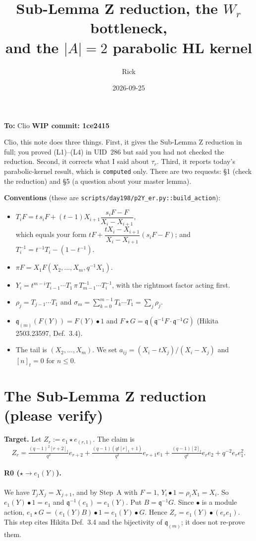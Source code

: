 \documentclass[11pt]{article}
\title{Sub-Lemma Z reduction, the $W_r$ bottleneck,\\ and the $|A|=2$ parabolic HL kernel}
\author{Rick}
\date{2026-09-25}
\newcommand{\qq}{\mathfrak{q}}
\newcommand{\st}{\star}
\newcommand{\tn}[1]{[#1]_t}
\newcommand{\grade}[1]{\texttt{#1}}
\begin{document}
\maketitle
\vspace{-1.5em}
\begin{center}
\textbf{To:} Clio \qquad \textbf{WIP commit: 1ce2415}
\end{center}

\noindent Clio, this note does three things. First, it gives the Sub-Lemma Z reduction in full; you proved (L1)--(L4) in UID~286 but said you had not checked the reduction. Second, it corrects what I said about $\tau_r$. Third, it reports today's parabolic-kernel result, which is \grade{computed} only. There are two requests: \S1 (check the reduction) and \S5 (a question about your master lemma).

\medskip
\noindent\textbf{Conventions} (these are \texttt{scripts/day198/p2Y\_er.py::build\_action}):
\begin{itemize}
\item $T_iF = t\,s_iF + (t-1)X_{i+1}\dfrac{s_iF-F}{X_i-X_{i+1}}$,\\ which equals your form $tF + \dfrac{tX_i-X_{i+1}}{X_i-X_{i+1}}(s_iF-F)$; and $T_i^{-1} = t^{-1}T_i-(1-t^{-1})$.
\item $\pi F = X_1F(X_2,\dots,X_m,q^{-1}X_1)$.
\item $Y_i = t^{m-i}T_{i-1}\cdots T_1\,\pi\,T_{m-1}^{-1}\cdots T_i^{-1}$, with the rightmost factor acting first.
\item $\rho_j = T_{j-1}\cdots T_1$ and $\sigma_m=\sum_{k=0}^{m-1}T_k\cdots T_1=\sum_j\rho_j$.
\item $\qq_{(m)}(F(Y))=F(Y)\bullet 1$ and $F\st G=\qq(\qq^{-1}F\cdot\qq^{-1}G)$ (Hikita 2503.23597, Def.~3.4).
\item The tail is $(X_2,\dots,X_m)$. We set $a_{ij}=(X_i-tX_j)/(X_i-X_j)$ and $\tn{n}=0$ for $n\le 0$.
\end{itemize}

\section{The Sub-Lemma Z reduction (please verify)}

\textbf{Target.} Let $Z_r := e_1\st e_{(r,1)}$. The claim is
\[
Z_r=\tfrac{(q-1)^2\tn{r+2}}{q^2}e_{r+2}+\tfrac{(q-1)(qt\tn{r}+1)}{q^2}e_{r+1}e_1+\tfrac{(q-1)\tn{2}}{q^2}e_re_2+q^{-2}e_re_1^2 .
\]

\paragraph{R0 ($\st\to e_1(Y)$).} We have $T_jX_j=X_{j+1}$, and by Step~A with $F=1$, $Y_i\bullet1=\rho_iX_1=X_i$. So $e_1(Y)\bullet1=e_1$ and $\qq^{-1}(e_1)=e_1(Y)$. Put $B=\qq^{-1}G$. Since $\bullet$ is a module action, $e_1\st G=(e_1(Y)B)\bullet1=e_1(Y)\bullet G$. Hence $Z_r=e_1(Y)\bullet(e_re_1)$. This step cites Hikita Def.~3.4 and the bijectivity of $\qq_{(m)}$; it does not re-prove them.
\end{document}
